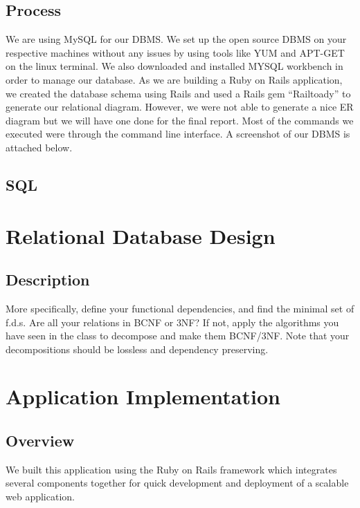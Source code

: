 \documentclass[12pt,letterpaper]{article}
\begin{document}
\subsection{Process}
We are using MySQL for our DBMS. We set up the open source DBMS on your respective machines without any issues by using tools like YUM and APT-GET on the linux terminal. We also downloaded and installed MYSQL workbench in order to manage our database. As we are building a Ruby on Rails application, we created the database schema using Rails and used a Rails gem “Railtoady” to generate our relational diagram. However, we were not able to generate a nice ER diagram but we will have one done for the final report. Most of the commands we executed were through the command line interface. A screenshot of our DBMS is attached below.

\subsection{SQL}

\clearpage\null

\section{Relational Database Design}

\subsection{Description}
More specifically, define your functional dependencies, and find the minimal set of f.d.s. Are all your relations in BCNF or 3NF? If not, apply the algorithms you have seen in the class to decompose and make them BCNF/3NF. Note that your decompositions should be lossless and dependency preserving.

\clearpage\null

\section{Application Implementation}

\subsection{Overview}
We built this application using the Ruby on Rails framework which integrates several components together for quick development and deployment of a scalable web application.
\end{document}
